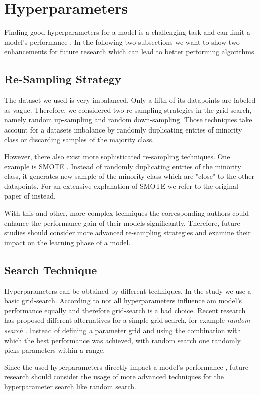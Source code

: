 \section{Hyperparameters}
\label{chp:future_work:sec:hyperparameters}
Finding good hyperparameters for a model is a challenging task and can limit a model's performance \parencite{Bergstra:2011,Zeiler:2012}.
In the following two subsections we want to show two enhancements for future research which can lead to better performing algorithms.

\subsection{Re-Sampling Strategy}
\label{chp:future_work:sec:hyperparameters:re_sampling_strategy}
The dataset we used is very imbalanced.
Only a fifth of its datapoints are labeled as vague.
Therefore, we considered two re-sampling strategies in the grid-search, namely random up-sampling and random down-sampling.
Those techniques take account for a datasets imbalance by randomly duplicating entries of minority class or discarding samples of the majority class.

However, there also exist more sophisticated re-sampling techniques.
One example is \ac{SMOTE} \parencite{Chawla:2002}.
Instead of randomly duplicating entries of the minority class, it generates new sample of the minority class which are "close" to the other datapoints.
For an extensive explanation of \ac{SMOTE} we refer to the original paper of \textcite{Chawla:2002} instead.

With this and other, more complex techniques the corresponding authors could enhance the performance gain of their models significantly.
Therefore, future studies should consider more advanced re-sampling strategies and examine their impact on the learning phase of a model.

\subsection{Search Technique}
\label{chp:future_work:sec:hyperparameters:search_technique}
Hyperparameters can be obtained by different techniques.
In the study we use a basic grid-search.
According to \textcite{Bergstra:2012} not all hyperparameters influence am model's performance equally and therefore grid-search is a bad choice.
Recent research has proposed different alternatives for a simple grid-search, for example \textit{random search} \parencite{Bergstra:2012}.
Instead of defining a parameter grid and using the combination with which the best performance was achieved, with random search one randomly picks parameters within a range.

Since the used hyperparameters directly impact a model's performance \parencite{Claesen:2015}, future research should consider the usage of more advanced techniques for the hyperparameter search like random search.
